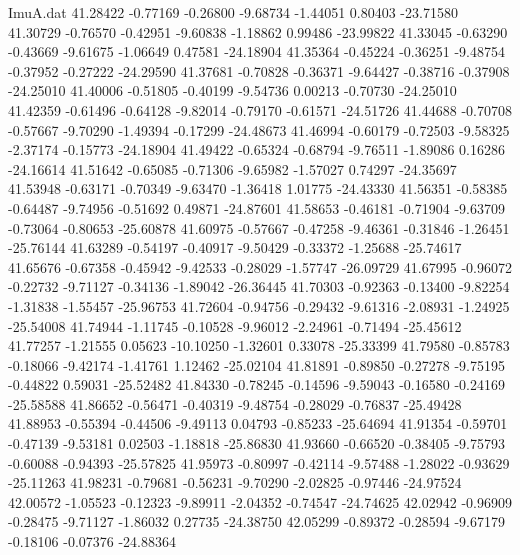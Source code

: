 \begin{filecontents}{ImuA.dat}
  41.28422   -0.77169   -0.26800   -9.68734   -1.44051    0.80403  -23.71580
  41.30729   -0.76570   -0.42951   -9.60838   -1.18862    0.99486  -23.99822
  41.33045   -0.63290   -0.43669   -9.61675   -1.06649    0.47581  -24.18904
  41.35364   -0.45224   -0.36251   -9.48754   -0.37952   -0.27222  -24.29590
  41.37681   -0.70828   -0.36371   -9.64427   -0.38716   -0.37908  -24.25010
  41.40006   -0.51805   -0.40199   -9.54736    0.00213   -0.70730  -24.25010
  41.42359   -0.61496   -0.64128   -9.82014   -0.79170   -0.61571  -24.51726
  41.44688   -0.70708   -0.57667   -9.70290   -1.49394   -0.17299  -24.48673
  41.46994   -0.60179   -0.72503   -9.58325   -2.37174   -0.15773  -24.18904
  41.49422   -0.65324   -0.68794   -9.76511   -1.89086    0.16286  -24.16614
  41.51642   -0.65085   -0.71306   -9.65982   -1.57027    0.74297  -24.35697
  41.53948   -0.63171   -0.70349   -9.63470   -1.36418    1.01775  -24.43330
  41.56351   -0.58385   -0.64487   -9.74956   -0.51692    0.49871  -24.87601
  41.58653   -0.46181   -0.71904   -9.63709   -0.73064   -0.80653  -25.60878
  41.60975   -0.57667   -0.47258   -9.46361   -0.31846   -1.26451  -25.76144
  41.63289   -0.54197   -0.40917   -9.50429   -0.33372   -1.25688  -25.74617
  41.65676   -0.67358   -0.45942   -9.42533   -0.28029   -1.57747  -26.09729
  41.67995   -0.96072   -0.22732   -9.71127   -0.34136   -1.89042  -26.36445
  41.70303   -0.92363   -0.13400   -9.82254   -1.31838   -1.55457  -25.96753
  41.72604   -0.94756   -0.29432   -9.61316   -2.08931   -1.24925  -25.54008
  41.74944   -1.11745   -0.10528   -9.96012   -2.24961   -0.71494  -25.45612
  41.77257   -1.21555    0.05623  -10.10250   -1.32601    0.33078  -25.33399
  41.79580   -0.85783   -0.18066   -9.42174   -1.41761    1.12462  -25.02104
  41.81891   -0.89850   -0.27278   -9.75195   -0.44822    0.59031  -25.52482
  41.84330   -0.78245   -0.14596   -9.59043   -0.16580   -0.24169  -25.58588
  41.86652   -0.56471   -0.40319   -9.48754   -0.28029   -0.76837  -25.49428
  41.88953   -0.55394   -0.44506   -9.49113    0.04793   -0.85233  -25.64694
  41.91354   -0.59701   -0.47139   -9.53181    0.02503   -1.18818  -25.86830
  41.93660   -0.66520   -0.38405   -9.75793   -0.60088   -0.94393  -25.57825
  41.95973   -0.80997   -0.42114   -9.57488   -1.28022   -0.93629  -25.11263
  41.98231   -0.79681   -0.56231   -9.70290   -2.02825   -0.97446  -24.97524
  42.00572   -1.05523   -0.12323   -9.89911   -2.04352   -0.74547  -24.74625
  42.02942   -0.96909   -0.28475   -9.71127   -1.86032    0.27735  -24.38750
  42.05299   -0.89372   -0.28594   -9.67179   -0.18106   -0.07376  -24.88364

\end{filecontents}
